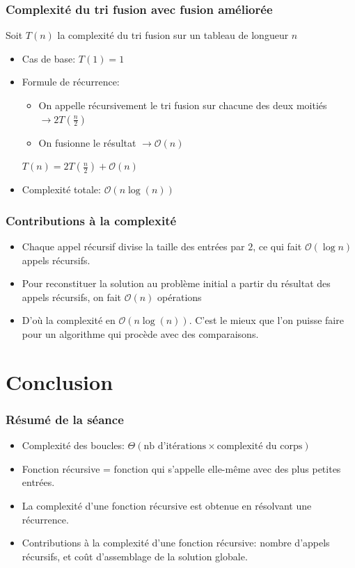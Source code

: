 \documentclass[aspectratio=169]{beamer}
\begin{document}
\begin{frame}
    \frametitle{Complexité du tri fusion avec fusion améliorée}
    Soit \(T(n)\) la complexité du tri fusion sur un tableau de longueur \(n\)

    \begin{itemize}
    \item Cas de base: \(T(1) = 1\)
    \item Formule de récurrence:
      \begin{itemize}
      \item On appelle récursivement le tri fusion sur chacune des deux moitiés
        \(\to 2T(\frac{n}{2})\)
      \item On fusionne le résultat \(\to \mathcal{O}(n)\)
      \end{itemize}
      \alert{\(T(n) = 2T(\frac{n}{2})+\mathcal{O}(n)\)}

    \item Complexité totale: \(\mathcal{O}(n\log(n))\)
    \end{itemize}

\end{frame}

\begin{frame}
    \frametitle{Contributions à la complexité}

    \begin{itemize}
    \item Chaque appel récursif divise la taille des entrées par \(2\), ce qui
      fait \(\mathcal{O}(\log n)\) appels récursifs.
    \item Pour reconstituer la solution au problème initial a partir du résultat
      des appels récursifs, on fait \(\mathcal{O}(n)\) opérations
    \item D'où la complexité en \(\mathcal{O}(n\log(n))\). C'est le mieux que
      l'on puisse faire pour un algorithme qui procède avec des comparaisons.
    \end{itemize}

\end{frame}


\section{Conclusion}
\begin{frame}
  \frametitle{Résumé de la séance}
  \begin{itemize}
  \item Complexité des boucles: \(\Theta(\text{nb d'itérations} \times
    \text{complexité du corps})\)
  \item Fonction récursive = fonction qui s'appelle elle-même avec des plus
    petites entrées.
  \item La complexité d'une fonction récursive est obtenue en résolvant une
    récurrence.
  \item Contributions à la complexité d'une fonction récursive: nombre d'appels
    récursifs, et coût d'assemblage de la solution globale.
  \end{itemize}
\end{frame}
\end{document}
